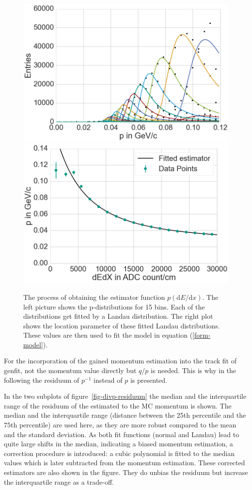 \begin{figure}
  \centering
  \includegraphics[width=0.48\linewidth]{figures/vxd/fitLandau1.png}
  \includegraphics[width=0.48\linewidth]{figures/vxd/fitLandau2.png}
  \caption[The process of obtaining the estimator function $p(\mathrm d E/\mathrm d x)$.]{The process of obtaining the estimator function $p(\mathrm d E/\mathrm d x)$. The left picture shows the p-distributions for 15 \dedx bins. Each of the distributions get fitted by a Landau distribution. The right plot shows the location parameter of these fitted Landau distributions. These values are then used to fit the model in equation (\ref{form-model}).}
  \label{fig-fit-bins}
\end{figure}

For the incorporation of the gained momentum estimation into the track fit of genfit, not the momentum value directly but $q/p$ is needed. This is why in the following the residuum of $p^{-1}$ instead of $p$ is presented.

In the two subplots of figure~\ref{fig-divp-residuum} the median and the interquartile range of the residuum of the estimated to the MC momentum is shown. The median and the interquartile range (distance between the 25th percentile and the 75th percentile) are used here, as they are more robust compared to the mean and the standard deviation. As both fit functions (normal and Landau) lead to quite large shifts in the median, indicating a biased momentum estimation, a correction procedure is introduced: a cubic polynomial is fitted to the median values which is later subtracted from the momentum estimation. These corrected estimators are also shown in the figure. They do unbias the residuum but increase the interquartile range as a trade-off.


